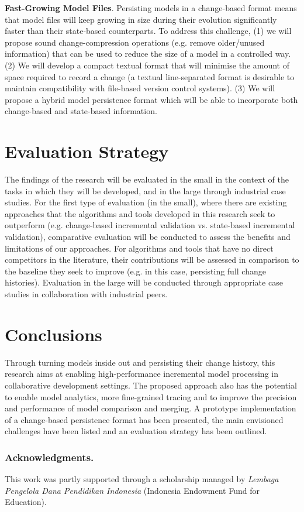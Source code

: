 \documentclass{llncs}
\begin{document}
\textbf{Fast-Growing Model Files}. Persisting models in a change-based format means that model files will keep growing in size during their evolution significantly faster than their state-based counterparts. To address this challenge, (1) we will propose sound change-compression operations (e.g. remove older/unused information) that can be used to reduce the size of a model in a controlled way. (2) We will develop a compact textual format that will minimise the amount of space required to record a change (a textual line-separated format is desirable to maintain compatibility with file-based version control systems). (3) We will propose a hybrid model persistence format which will be able to incorporate both change-based and state-based information. 

\section{Evaluation Strategy}
\label{Evaluation Strategy}
The findings of the research will be evaluated in the small in the context of the tasks in which they will be developed, and in the large through industrial case studies. For the first type of evaluation (in the small), where there are existing approaches that the algorithms and tools developed in this research seek to outperform (e.g. change-based incremental validation vs. state-based incremental validation), comparative evaluation will be conducted to assess the benefits and limitations of our approaches. For algorithms and tools that have no direct competitors in the literature, their contributions will be assessed in comparison to the baseline they seek to improve (e.g. in this case, persisting full change histories). Evaluation in the large will be conducted through appropriate case studies in collaboration with industrial peers.

\section{Conclusions}
\label{Conclusions}
Through turning models inside out and persisting their change history, this research aims at enabling high-performance incremental model processing in collaborative development settings. The proposed approach also has the potential to enable model analytics, more fine-grained tracing and to improve the precision and performance of model comparison and merging. A prototype implementation of a change-based persistence format has been presented, the main envisioned challenges have been listed and an evaluation strategy has been outlined. %

\subsubsection*{Acknowledgments.} This work was partly supported through a scholarship managed by \emph{Lembaga Pengelola Dana Pendidikan Indonesia} (Indonesia Endowment Fund for Education).

 

\end{document}
